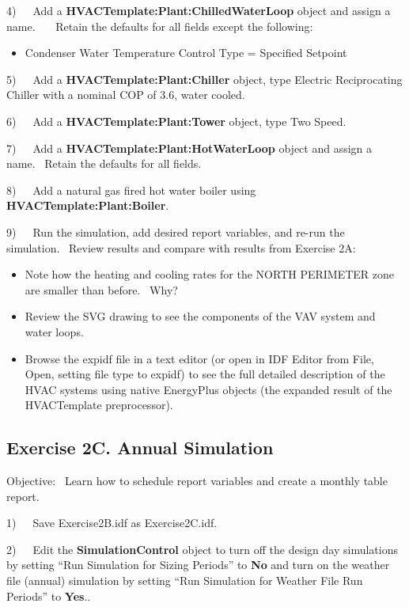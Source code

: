 4)~~~Add a \textbf{HVACTemplate:Plant:ChilledWaterLoop} object and assign a name.~~~ Retain the defaults for all fields except the following:

\begin{itemize}
\tightlist
\item
  Condenser Water Temperature Control Type = Specified Setpoint
\end{itemize}

5)~~~Add a \textbf{HVACTemplate:Plant:Chiller} object, type Electric Reciprocating Chiller with a nominal COP of 3.6, water cooled.

6)~~~Add a \textbf{HVACTemplate:Plant:Tower} object, type Two Speed.

7)~~~Add a \textbf{HVACTemplate:Plant:HotWaterLoop} object and assign a name.~ Retain the defaults for all fields.

8)~~~Add a natural gas fired hot water boiler using \textbf{HVACTemplate:Plant:Boiler}.

9)~~~Run the simulation, add desired report variables, and re-run the simulation.~ Review results and compare with results from Exercise 2A:

\begin{itemize}
\item
  Note how the heating and cooling rates for the NORTH PERIMETER zone are smaller than before.~ Why?
\item
  Review the SVG drawing to see the components of the VAV system and water loops.
\item
  Browse the expidf file in a text editor (or open in IDF Editor from File, Open, setting file type to expidf) to see the full detailed description of the HVAC systems using native EnergyPlus objects (the expanded result of the HVACTemplate preprocessor).
\end{itemize}

\subsection{Exercise 2C. Annual Simulation}\label{exercise-2c.-annual-simulation}

Objective:~ Learn how to schedule report variables and create a monthly table report.

1)~~~Save Exercise2B.idf as Exercise2C.idf.

2)~~~Edit the \textbf{SimulationControl} object to turn off the design day simulations by setting ``Run Simulation for Sizing Periods'' to \textbf{No} and turn on the weather file (annual) simulation by setting ``Run Simulation for Weather File Run Periods'' to \textbf{Yes}..

